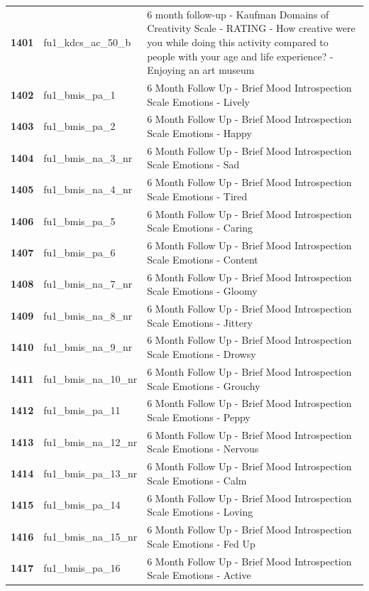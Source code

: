 \documentclass[
  letterpaper,
  DIV=11,
  numbers=noendperiod]{scrartcl}
\begin{document}
\begin{longtable}[t]{>{}cll}
\addlinespace
\textbf{1401} & fu1\_kdcs\_ac\_50\_b & 6 month follow-up - Kaufman Domains of Creativity Scale - RATING - How creative were you while doing this activity compared to people with your age and life experience? - Enjoying an art museum\\
\textbf{1402} & fu1\_bmis\_pa\_1 & 6 Month Follow Up - Brief Mood Introspection Scale Emotions - Lively\\
\textbf{1403} & fu1\_bmis\_pa\_2 & 6 Month Follow Up - Brief Mood Introspection Scale Emotions - Happy\\
\textbf{1404} & fu1\_bmis\_na\_3\_nr & 6 Month Follow Up - Brief Mood Introspection Scale Emotions - Sad\\
\textbf{1405} & fu1\_bmis\_na\_4\_nr & 6 Month Follow Up - Brief Mood Introspection Scale Emotions - Tired\\
\addlinespace
\textbf{1406} & fu1\_bmis\_pa\_5 & 6 Month Follow Up - Brief Mood Introspection Scale Emotions - Caring\\
\textbf{1407} & fu1\_bmis\_pa\_6 & 6 Month Follow Up - Brief Mood Introspection Scale Emotions - Content\\
\textbf{1408} & fu1\_bmis\_na\_7\_nr & 6 Month Follow Up - Brief Mood Introspection Scale Emotions - Gloomy\\
\textbf{1409} & fu1\_bmis\_na\_8\_nr & 6 Month Follow Up - Brief Mood Introspection Scale Emotions - Jittery\\
\textbf{1410} & fu1\_bmis\_na\_9\_nr & 6 Month Follow Up - Brief Mood Introspection Scale Emotions - Drowsy\\
\addlinespace
\textbf{1411} & fu1\_bmis\_na\_10\_nr & 6 Month Follow Up - Brief Mood Introspection Scale Emotions - Grouchy\\
\textbf{1412} & fu1\_bmis\_pa\_11 & 6 Month Follow Up - Brief Mood Introspection Scale Emotions - Peppy\\
\textbf{1413} & fu1\_bmis\_na\_12\_nr & 6 Month Follow Up - Brief Mood Introspection Scale Emotions - Nervous\\
\textbf{1414} & fu1\_bmis\_pa\_13\_nr & 6 Month Follow Up - Brief Mood Introspection Scale Emotions - Calm\\
\textbf{1415} & fu1\_bmis\_pa\_14 & 6 Month Follow Up - Brief Mood Introspection Scale Emotions - Loving\\
\addlinespace
\textbf{1416} & fu1\_bmis\_na\_15\_nr & 6 Month Follow Up - Brief Mood Introspection Scale Emotions - Fed Up\\
\textbf{1417} & fu1\_bmis\_pa\_16 & 6 Month Follow Up - Brief Mood Introspection Scale Emotions - Active\\

\end{longtable}
\end{document}
